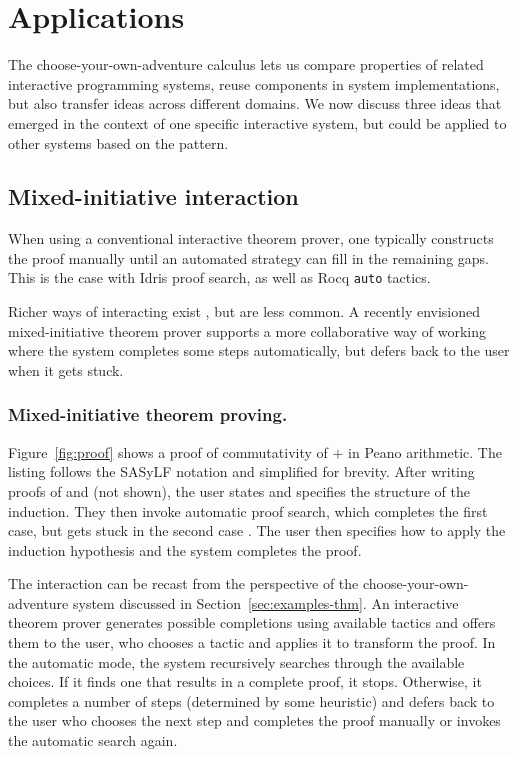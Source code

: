 \documentclass[nonacm,anonymous,sigplan,screen]{acmart}
\newcommand{\ident}[1]{\textsf{\color{DarkSlateBlue}{#1}}}
\begin{document}
\section{Applications}
\label{sec:applications}

The choose-your-own-adventure calculus lets us compare properties of related interactive programming
systems, reuse components in system implementations, but also transfer
ideas across different domains. We now discuss three ideas that emerged in the context
of one specific interactive system, but could be applied to other systems based on the pattern.

\subsection{Mixed-initiative interaction}
When using a conventional interactive theorem prover, one typically constructs the proof manually until an
automated strategy can fill in the remaining gaps. This is the case with Idris proof search,
as well as Rocq \texttt{auto} tactics.

Richer ways of interacting exist \cite{lowe-1997-xbarnacle},
but are less common. A recently envisioned mixed-initiative theorem prover \cite{verter-2024-mixed}
supports a more collaborative way of working where the system completes some
steps automatically, but defers back to the user when it gets stuck.

\subsubsection*{Mixed-initiative theorem proving.}
Figure~\ref{fig:proof} shows a proof of commutativity of $+$ in Peano arithmetic.
The listing follows the SASyLF notation \cite{aldrich-2008-sasylf,aldrich-2025-sum} and simplified for brevity.
After writing proofs of \ident{sum-z-rh} and \ident{sum-s-rh} (not shown), the user states
\ident{sum-commutes} and specifies the structure of the induction. They then invoke automatic
proof search, which completes the first case, but gets stuck in the second case \cite{verter-2024-mixed}.
The user then specifies how to apply the induction hypothesis and the system
completes the proof.

The interaction can be recast from the perspective of the choose-your-own-adventure system
discussed in Section~\ref{sec:examples-thm}. An interactive theorem prover generates possible
completions using available tactics and offers them to the user, who chooses a tactic and
applies it to transform the proof. In the automatic mode, the system
recursively searches through the available choices. If it finds one that results in a complete
proof, it stops. Otherwise, it completes a number of steps (determined by some heuristic)
and defers back to the user who chooses the next step and completes the proof manually or
invokes the automatic search again.
\end{document}
